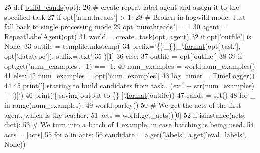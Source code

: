 \begin{DoxyCode}
25 \textcolor{keyword}{def }\hyperlink{namespaceparlai_1_1scripts_1_1build__candidates_a7932b774b6e77c36347f89f3d79c676e}{build\_cands}(opt):
26     \textcolor{comment}{# create repeat label agent and assign it to the specified task}
27     \textcolor{keywordflow}{if} opt[\textcolor{stringliteral}{'numthreads'}] > 1:
28         \textcolor{comment}{# Broken in hogwild mode. Just fall back to single processing mode}
29         opt[\textcolor{stringliteral}{'numthreads'}] = 1
30     agent = RepeatLabelAgent(opt)
31     world = \hyperlink{namespaceparlai_1_1core_1_1worlds_a11923c10b545c7ecc1b08fe2242d9c2c}{create\_task}(opt, agent)
32     \textcolor{keywordflow}{if} opt[\textcolor{stringliteral}{'outfile'}] \textcolor{keywordflow}{is} \textcolor{keywordtype}{None}:
33         outfile = tempfile.mkstemp(
34             prefix=\textcolor{stringliteral}{'\{\}\_\{\}\_'}.\hyperlink{namespaceparlai_1_1chat__service_1_1services_1_1messenger_1_1shared__utils_a32e2e2022b824fbaf80c747160b52a76}{format}(opt[\textcolor{stringliteral}{'task'}], opt[\textcolor{stringliteral}{'datatype'}]), suffix=\textcolor{stringliteral}{'.txt'}
35         )[1]
36     \textcolor{keywordflow}{else}:
37         outfile = opt[\textcolor{stringliteral}{'outfile'}]
38 
39     \textcolor{keywordflow}{if} opt.get(\textcolor{stringliteral}{'num\_examples'}, -1) == -1:
40         num\_examples = world.num\_examples()
41     \textcolor{keywordflow}{else}:
42         num\_examples = opt[\textcolor{stringliteral}{'num\_examples'}]
43     log\_timer = TimeLogger()
44 
45     print(\textcolor{stringliteral}{'[ starting to build candidates from task.. (ex:'} + \hyperlink{namespacegenerate__task__READMEs_a5b88452ffb87b78c8c85ececebafc09f}{str}(num\_examples) + \textcolor{stringliteral}{')]'})
46     print(\textcolor{stringliteral}{'[ saving output to \{\} ]'}.\hyperlink{namespaceparlai_1_1chat__service_1_1services_1_1messenger_1_1shared__utils_a32e2e2022b824fbaf80c747160b52a76}{format}(outfile))
47     cands = set()
48     \textcolor{keywordflow}{for} \_ \textcolor{keywordflow}{in} range(num\_examples):
49         world.parley()
50         \textcolor{comment}{# We get the acts of the first agent, which is the teacher.}
51         acts = world.get\_acts()[0]
52         \textcolor{keywordflow}{if} isinstance(acts, dict):
53             \textcolor{comment}{# We turn into a batch of 1 example, in case batching is being used.}
54             acts = [acts]
55         \textcolor{keywordflow}{for} a \textcolor{keywordflow}{in} acts:
56             candidate = a.get(\textcolor{stringliteral}{'labels'}, a.get(\textcolor{stringliteral}{'eval\_labels'}, \textcolor{keywordtype}{None}))

\end{DoxyCode}
